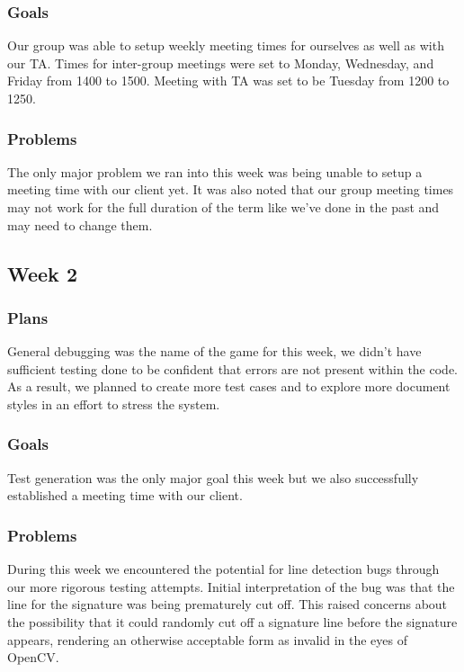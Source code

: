\documentclass[onecolumn, draftclsnofoot,10pt, compsoc]{IEEEtran}
\begin{document}
\subsubsection{Goals}
Our group was able to setup weekly meeting times for ourselves as well as with our TA. Times for inter-group meetings were set to Monday, Wednesday, and Friday from 1400 to 1500. Meeting with TA was set to be Tuesday from 1200 to 1250.  

\subsubsection{Problems}
The only major problem we ran into this week was being unable to setup a meeting time with our client yet. It was also noted that our group meeting times may not work for the full duration of the term like we've done in the past and may need to change them.

\subsection{Week 2}
\subsubsection{Plans}
General debugging was the name of the game for this week, we didn't have sufficient testing done to be confident that errors are not present within the code. As a result, we planned to create more test cases and to explore more document styles in an effort to stress the system.

\subsubsection{Goals}
Test generation was the only major goal this week but we also successfully established a meeting time with our client.  

\subsubsection{Problems}
During this week we encountered the potential for line detection bugs through our more rigorous testing attempts. Initial interpretation of the bug was that the line for the signature was being prematurely cut off. This raised concerns about the possibility that it could randomly cut off a signature line before the signature appears, rendering an otherwise acceptable form as invalid in the eyes of OpenCV.
\end{document}
